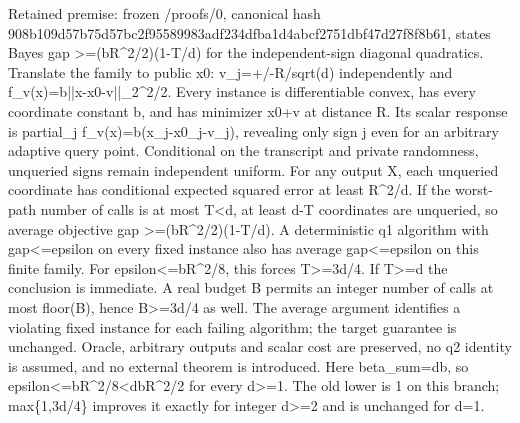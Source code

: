 \documentclass[10pt,a4paper]{article}
\begin{document}
\begingroup\raggedright\sloppy Retained premise:\allowbreak{} frozen /\allowbreak{}proofs/\allowbreak{}0,\allowbreak{} canonical hash 908b109d57b75d57bc2f95589983adf234dfba1d4abcf2751dbf47d27f8f8b61,\allowbreak{} states Bayes gap >=\allowbreak{}(bR\textasciicircum{}2/\allowbreak{}2)(1-T/\allowbreak{}d) for the independent-sign diagonal quadratics. Translate the family to public x0:\allowbreak{} v\_\allowbreak{}j=\allowbreak{}+/\allowbreak{}-R/\allowbreak{}sqrt(d) independently and f\_\allowbreak{}v(x)=\allowbreak{}b||x-x0-v||\_\allowbreak{}2\textasciicircum{}2/\allowbreak{}2. Every instance is differentiable convex,\allowbreak{} has every coordinate constant b,\allowbreak{} and has minimizer x0+v at distance R. Its scalar response is partial\_\allowbreak{}j f\_\allowbreak{}v(x)=\allowbreak{}b(x\_\allowbreak{}j-x0\_\allowbreak{}j-v\_\allowbreak{}j),\allowbreak{} revealing only sign j even for an arbitrary adaptive query point. Conditional on the transcript and private randomness,\allowbreak{} unqueried signs remain independent uniform. For any output X,\allowbreak{} each unqueried coordinate has conditional expected squared error at least R\textasciicircum{}2/\allowbreak{}d. If the worst-path number of calls is at most T<d,\allowbreak{} at least d-T coordinates are unqueried,\allowbreak{} so average objective gap >=\allowbreak{}(bR\textasciicircum{}2/\allowbreak{}2)(1-T/\allowbreak{}d). A deterministic q1 algorithm with gap<=\allowbreak{}epsilon on every fixed instance also has average gap<=\allowbreak{}epsilon on this finite family. For epsilon<=\allowbreak{}bR\textasciicircum{}2/\allowbreak{}8,\allowbreak{} this forces T>=\allowbreak{}3d/\allowbreak{}4. If T>=\allowbreak{}d the conclusion is immediate. A real budget B permits an integer number of calls at most floor(B),\allowbreak{} hence B>=\allowbreak{}3d/\allowbreak{}4 as well. The average argument identifies a violating fixed instance for each failing algorithm;\allowbreak{} the target guarantee is unchanged. Oracle,\allowbreak{} arbitrary outputs and scalar cost are preserved,\allowbreak{} no q2 identity is assumed,\allowbreak{} and no external theorem is introduced. Here beta\_\allowbreak{}sum=\allowbreak{}db,\allowbreak{} so epsilon<=\allowbreak{}bR\textasciicircum{}2/\allowbreak{}8<dbR\textasciicircum{}2/\allowbreak{}2 for every d>=\allowbreak{}1. The old lower is 1 on this branch;\allowbreak{} max\{1,\allowbreak{}3d/\allowbreak{}4\} improves it exactly for integer d>=\allowbreak{}2 and is unchanged for d=\allowbreak{}1.\par\endgroup
\end{document}
